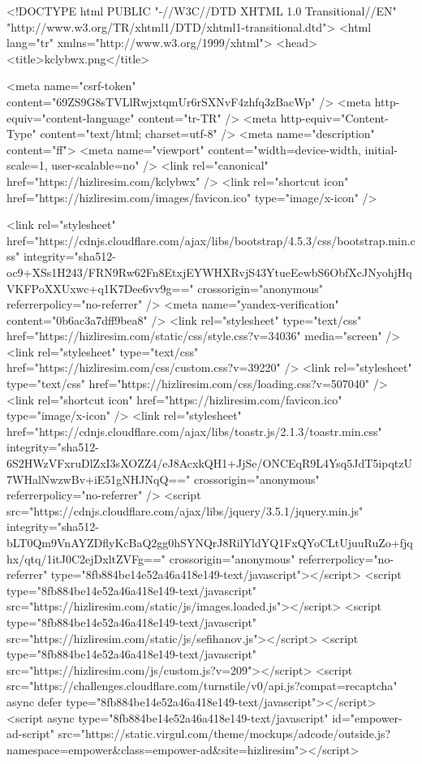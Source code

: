 <!DOCTYPE html PUBLIC "-//W3C//DTD XHTML 1.0 Transitional//EN" "http://www.w3.org/TR/xhtml1/DTD/xhtml1-transitional.dtd">
<html lang="tr" xmlns="http://www.w3.org/1999/xhtml">
<head>
<title>kclybwx.png</title>

<meta name="csrf-token" content="69ZS9G8sTVLlRwjxtqmUr6rSXNvF4zhfq3zBacWp" />
<meta http-equiv="content-language" content="tr-TR" />
<meta http-equiv="Content-Type" content="text/html; charset=utf-8" />
<meta name="description" content="ff">
<meta name="viewport" content="width=device-width, initial-scale=1, user-scalable=no" />
<link rel="canonical" href="https://hizliresim.com/kclybwx" />
<link rel="shortcut icon" href="https://hizliresim.com/images/favicon.ico" type="image/x-icon" />


<link rel="stylesheet" href="https://cdnjs.cloudflare.com/ajax/libs/bootstrap/4.5.3/css/bootstrap.min.css" integrity="sha512-oc9+XSs1H243/FRN9Rw62Fn8EtxjEYWHXRvjS43YtueEewbS6ObfXcJNyohjHqVKFPoXXUxwc+q1K7Dee6vv9g==" crossorigin="anonymous" referrerpolicy="no-referrer" />
<meta name="yandex-verification" content="0b6ac3a7dff9bea8" />
<link rel="stylesheet" type="text/css" href="https://hizliresim.com/static/css/style.css?v=34036" media="screen" />
<link rel="stylesheet" type="text/css" href="https://hizliresim.com/css/custom.css?v=39220" />
<link rel="stylesheet" type="text/css" href="https://hizliresim.com/css/loading.css?v=507040" />
<link rel="shortcut icon" href="https://hizliresim.com/favicon.ico" type="image/x-icon" />
<link rel="stylesheet" href="https://cdnjs.cloudflare.com/ajax/libs/toastr.js/2.1.3/toastr.min.css" integrity="sha512-6S2HWzVFxruDlZxI3sXOZZ4/eJ8AcxkQH1+JjSe/ONCEqR9L4Ysq5JdT5ipqtzU7WHalNwzwBv+iE51gNHJNqQ==" crossorigin="anonymous" referrerpolicy="no-referrer" />
<script src="https://cdnjs.cloudflare.com/ajax/libs/jquery/3.5.1/jquery.min.js" integrity="sha512-bLT0Qm9VnAYZDflyKcBaQ2gg0hSYNQrJ8RilYldYQ1FxQYoCLtUjuuRuZo+fjqhx/qtq/1itJ0C2ejDxltZVFg==" crossorigin="anonymous" referrerpolicy="no-referrer" type="8fb884be14e52a46a418e149-text/javascript"></script>
<script type="8fb884be14e52a46a418e149-text/javascript" src="https://hizliresim.com/static/js/images.loaded.js"></script>
<script type="8fb884be14e52a46a418e149-text/javascript" src="https://hizliresim.com/static/js/sefihanov.js"></script>
<script type="8fb884be14e52a46a418e149-text/javascript" src="https://hizliresim.com/js/custom.js?v=209"></script>
<script src="https://challenges.cloudflare.com/turnstile/v0/api.js?compat=recaptcha" async defer type="8fb884be14e52a46a418e149-text/javascript"></script>
<script async type="8fb884be14e52a46a418e149-text/javascript" id="empower-ad-script" src="https://static.virgul.com/theme/mockups/adcode/outside.js?namespace=empower&class=empower-ad&site=hizliresim"></script>

